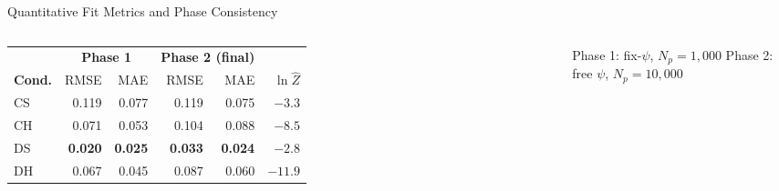 \documentclass[aspectratio=169,10pt,t]{beamer}
\newcommand{\hl}[1]{\textbf{\textcolor{ikm}{#1}}}
\begin{document}
\begin{frame}[t]{Quantitative Fit Metrics and Phase Consistency}
  \small\vspace{4pt}
  \begin{columns}[T]
      \centering
      \renewcommand{\arraystretch}{1.25}
      \begin{tabular}{@{}l rr rr r@{}}
        \toprule
        & \multicolumn{2}{c}{\textbf{Phase 1}} & \multicolumn{2}{c}{\textbf{Phase 2 (final)}}
        & \\
        \cmidrule(lr){2-3}\cmidrule(lr){4-5}
        \textbf{Cond.} & RMSE & MAE & RMSE & MAE & $\ln\hat Z$\\
        \midrule
        CS & 0.119 & 0.077 & 0.119 & 0.075 & $-3.3$\\
        CH & 0.071 & 0.053 & 0.104 & 0.088 & $-8.5$\\
        DS & \hl{\textbf{0.020}} & \hl{\textbf{0.025}} & \hl{\textbf{0.033}} & \hl{\textbf{0.024}} & $\mathbf{-2.8}$\\
        DH & 0.067 & 0.045 & 0.087 & 0.060 & $-11.9$\\
        \bottomrule
      \end{tabular}
      \vspace{6pt}
      {\scriptsize Phase 1: fix-$\psi$,\; $N_p=1{,}000$\quad
       Phase 2: free $\psi$,\; $N_p=10{,}000$}
      \vspace{10pt}


\end{columns}
\end{frame}
\end{document}
